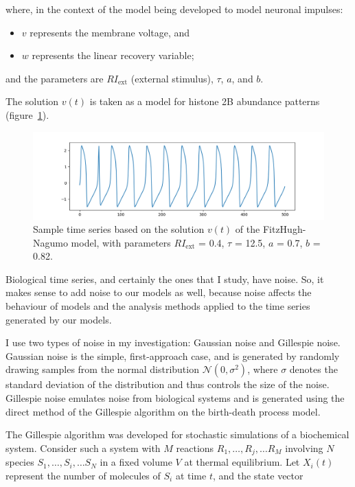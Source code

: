 where, in the context of the model being developed to model neuronal impulses:
\begin{itemize}
  \item $v$ represents the membrane voltage, and
  \item $w$ represents the linear recovery variable;
\end{itemize}

and the parameters are $RI_{\mathrm{ext}}$ (external stimulus), $\tau$, $a$, and $b$.

The solution $v(t)$ is taken as a model for histone 2B abundance patterns (figure~\ref{fig:fitzhughnagumo_sample}).

\begin{figure}
  \centering
  \includegraphics[width=0.9\linewidth]{fitzhughnagumo_sample.png}
  \caption{
    Sample time series based on the solution $v(t)$ of the FitzHugh-Nagumo model, with parameters
    $RI_{\mathrm{ext}}$ = 0.4, $\tau$ = 12.5, $a$ = 0.7, $b$ = 0.82.
  }
  \label{fig:fitzhughnagumo_sample}
\end{figure}

Biological time series, and certainly the ones that I study, have noise.
So, it makes sense to add noise to our models as well, because noise affects the behaviour of models and the analysis methods applied to the time series generated by our models.

I use two types of noise in my investigation: Gaussian noise and Gillespie noise.
Gaussian noise is the simple, first-approach case, and is generated by randomly drawing samples from the normal distribution $\mathcal{N}(0,\sigma^{2})$, where $\sigma$ denotes the standard deviation of the distribution and thus controls the size of the noise.
Gillespie noise emulates noise from biological systems and is generated using the direct method of the Gillespie algorithm \parencite{gillespieExactStochasticSimulation1977} on the birth-death process model.

The Gillespie algorithm was developed for stochastic simulations of a biochemical system.
Consider such a system with $M$ reactions $R_{1}, \ldots , R_{j}, \ldots R_{M}$ involving $N$ species $S_{1}, \ldots , S_{i}, \ldots S_{N}$ in a fixed volume $V$ at thermal equilibrium.
Let $X_{i}(t)$ represent the number of molecules of $S_{i}$ at time $t$, and the state vector

